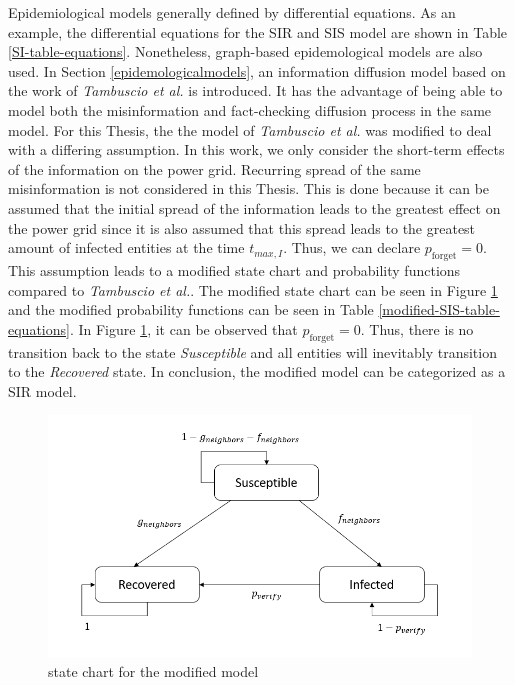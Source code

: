 Epidemiological models generally defined by differential equations.
As an example, the differential equations for the SIR and SIS 
model are shown in Table \ref{SI-table-equations}.
Nonetheless, graph-based epidemological models are also used.
In Section \ref{epidemologicalmodels}, an information 
diffusion model based on the work of \textit{Tambuscio et al.} 
\cite{sirsmodel} is introduced. It has the advantage of being 
able to model both the misinformation and fact-checking 
diffusion process in the same model. 
For this Thesis, the the model of \textit{Tambuscio et al.} was
modified to deal with a differing assumption.
In this work, we only consider the short-term effects of the information 
on the power grid. Recurring spread of the same misinformation
is not considered in this Thesis. This is done because it can be 
assumed that the initial spread of the information leads to the 
greatest effect on the power grid since it is also assumed that this
spread leads to the greatest amount of infected entities at
the time $t_{max,I}$. Thus, we can declare $p_{\mathrm{forget}} = 0$.
This assumption leads to a modified state chart and probability
functions compared to \textit{Tambuscio et al.}. The modified
state chart can be seen in Figure \ref{modifiedmodelstatechart}
and the modified probability functions can be seen in Table
\ref{modified-SIS-table-equations}. In Figure 
\ref{modifiedmodelstatechart}, it can be observed that 
$p_{\mathrm{forget}} = 0$. Thus, there is no transition back to 
the state \textit{Susceptible} and all entities
will inevitably transition to the \textit{Recovered} state. 
In conclusion, the modified model can be categorized as a SIR model. 


\begin{figure}[!ht]
    \center
    \includegraphics[scale=.9]{figs/Tambuscio_modified.png}
    \caption{state chart for the modified model}
    \label{modifiedmodelstatechart}
\end{figure}

